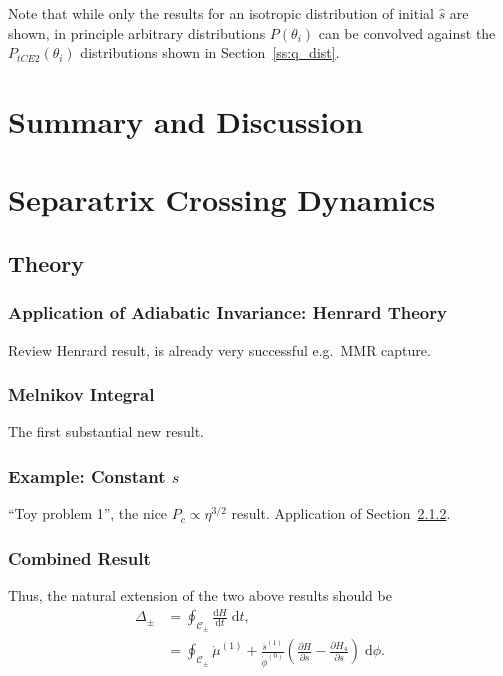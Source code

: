 \documentclass[twocolumn]{aastex63}
\newcommand*{\rd}[2]{\frac{\mathrm{d}#1}{\mathrm{d}#2}}
\newcommand*{\pd}[2]{\frac{\partial#1}{\partial#2}}
\newcommand*{\p}[1]{\left(#1\right)}
\begin{document}
Note that while only the results for an isotropic distribution of initial
$\hat{s}$ are shown, in principle arbitrary distributions $P\p{\theta_i}$ can be
convolved against the $P_{tCE2}\p{\theta_i}$ distributions shown in
Section~\ref{ss:q_dist}.

\section{Summary and Discussion}\label{s:summary}




\appendix

\section{Separatrix Crossing Dynamics}

\subsection{Theory}\label{app:sep_crossing_dynamics}

\subsubsection{Application of Adiabatic Invariance: Henrard Theory}

Review Henrard result, is already very successful e.g.\ MMR capture.

\subsubsection{Melnikov Integral}\label{sss:Melnikov}

The first substantial new result.

\subsubsection{Example: Constant $s$}

``Toy problem 1'', the nice $P_c \propto \eta^{3/2}$ result. Application of
Section~\ref{sss:Melnikov}.

\subsubsection{Combined Result}

Thus, the natural extension of the two above results should be
\begin{align}
    \Delta_{\pm} &= \oint_{\mathcal{C}_{\pm}} \rd{H}{t}\;\mathrm{d}t,\\
        &= \oint_{\mathcal{C}_{\pm}}
            \dot{\mu}^{(1)} + \frac{\dot{s}^{(1)}}{\dot{\phi}^{(0)}}
                \p{\pd{H}{s} - \pd{H_4}{s}}\;\mathrm{d}\phi.
\end{align}
\end{document}
